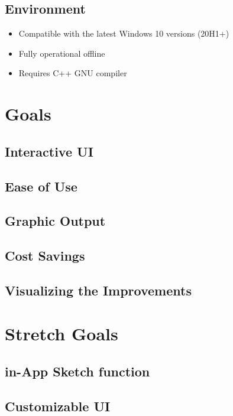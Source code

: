 \documentclass{article}
\begin{document}
\subsection{Environment}
\begin{itemize}
  \item Compatible with the latest Windows 10 versions (20H1+)
  \item Fully operational offline 
  \item Requires C++ GNU compiler 
\end{itemize}

\section{Goals}

\subsection {Interactive UI}

\subsection {Ease of Use}

\subsection {Graphic Output}

\subsection {Cost Savings}

\subsection {Visualizing the Improvements}

\section{Stretch Goals}

\subsection {in-App Sketch function}

\subsection {Customizable UI}
\end{document}
